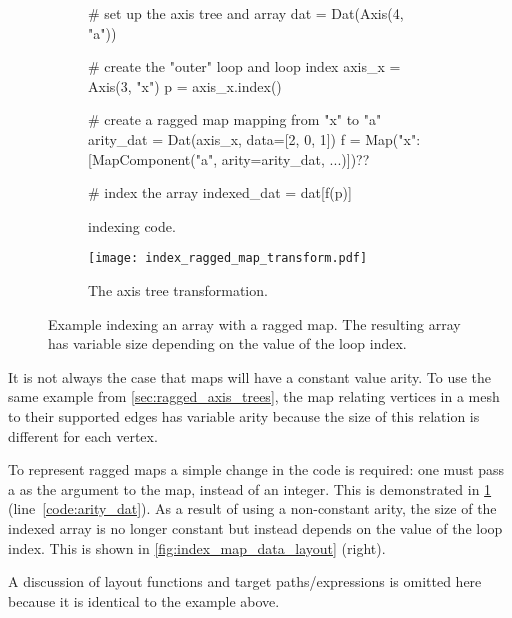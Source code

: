\documentclass[thesis]{subfiles}
\begin{document}
\begin{figure}
  \centering

  \begin{subfigure}{.9\textwidth}
    \begin{pyalg2}
      # set up the axis tree and array
      dat = Dat(Axis(4, "a"))

      # create the "outer" loop and loop index
      axis_x = Axis(3, "x")
      p = axis_x.index()

      # create a ragged map mapping from "x" to "a"
      arity_dat = Dat(axis_x, data=[2, 0, 1])
      f = Map({"x": [MapComponent("a", arity=arity_dat, ...)]})?\label{code:arity_dat}?

      # index the array
      indexed_dat = dat[f(p)]
    \end{pyalg2}

    \caption{ indexing code.}
    \label{fig:index_ragged_map_code}
  \end{subfigure}

  \vspace{1em}

  \begin{subfigure}{\textwidth}
    \centering
    \texttt{[image: index\_ragged\_map\_transform.pdf]}
    \caption{The axis tree transformation.}
    \label{fig:index_ragged_map_transform}
  \end{subfigure}

  \caption{
    Example indexing an array with a ragged map.
    The resulting array has variable size depending on the value of the loop index.
  }
  \label{fig:index_ragged_map}
\end{figure}

It is not always the case that maps will have a constant value arity.
To use the same example from \cref{sec:ragged_axis_trees}, the map relating vertices in a mesh to their supported edges has variable arity because the size of this relation is different for each vertex.

To represent ragged maps a simple change in the code is required: one must pass a  as the  argument to the map, instead of an integer.
This is demonstrated in \cref{fig:index_ragged_map_code} (line~\ref{code:arity_dat}).
As a result of using a non-constant arity, the size of the indexed array is no longer constant but instead depends on the value of the loop index.
This is shown in \cref{fig:index_map_data_layout} (right).

A discussion of layout functions and target paths/expressions is omitted here because it is identical to the example above.
\end{document}
